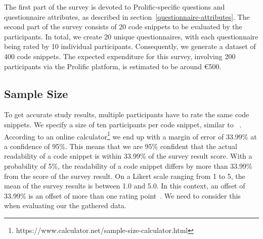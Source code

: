 \documentclass[%
class=scrreprt,
chapterprefix=false,%
open=right,%
twoside=false,%
paper=a4,%
logofile={Logo\_zentral\_farbig\_EN.png},%
thesistype=masterproposal,%
UKenglish,%
]{se2thesis}
\begin{document}
The first part of the survey is devoted to Prolific-specific questions and questionnaire attributes, as described in section~\ref{questionnaire-attributes}. The second part of the survey consists of 20 code snippets to be evaluated by the participants.
In total, we create 20 unique questionnaires, with each questionnaire being rated by 10 individual participants. Consequently, we generate a dataset of 400 code snippets. The expected expenditure for this survey, involving 200 participants via the Prolific platform, is estimated to be around €500.

\subsection{Sample Size}
To get accurate study results, multiple participants have to rate the same code snippets. We specify a size of ten participants per code snippet, similar to \citeauthor{scalabrino2016improving}~\cite{scalabrino2016improving}. According to an online calculator\footnote{https://www.calculator.net/sample-size-calculator.html} we end up with a margin of error of 33.99\% at a confidence of 95\%. This means that we are 95\% confident that the actual readability of a code snippet is within 33.99\% of the survey result score. With a probability of 5\%, the readability of a code snippet differs by more than 33.99\% from the score of the survey result. On a Likert scale ranging from 1 to 5, the mean of the survey results is between 1.0 and 5.0. In this context, an offset of 33.99\% is an offset of more than one rating point~\cite{likert1932technique}. We need to consider this when evaluating our the gathered data.



\end{document}
